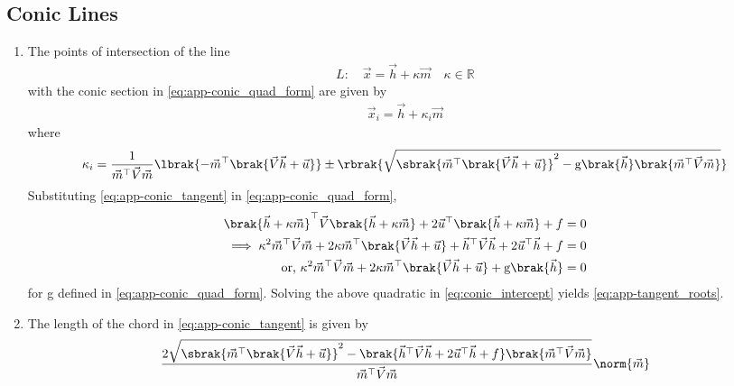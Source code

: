 \subsection{Conic Lines}
\begin{enumerate}[label=\thesubsection.\arabic*.,ref=\thesubsection.\theenumi]
 \item
	 \label{prop:chord}
  The points of intersection of the line 
\begin{align}
L: \quad \vec{x} = \vec{h} + \kappa \vec{m} \quad \kappa \in \mathbb{R}
\label{eq:app-conic_tangent}
\end{align}
with the conic section in \eqref{eq:app-conic_quad_form} are given by
\begin{align}
\vec{x}_i = \vec{h} + \kappa_i \vec{m}
	\label{eq:app-chord-pts}
\end{align}
%
where
\begin{multline}
\kappa_i = \frac{1}
{
\vec{m}^{\top}\vec{V}\vec{m}
}
\lbrak{-\vec{m}^{\top}\brak{\vec{V}\vec{h}+\vec{u}}}
\pm
\rbrak{\sqrt{
\sbrak{
\vec{m}^{\top}\brak{\vec{V}\vec{h}+\vec{u}}
}^2
	-\text{g}
\brak
{\vec{h}
}
\brak{\vec{m}^{\top}\vec{V}\vec{m}}
}
}
\label{eq:app-tangent_roots}
\end{multline}
\solution
  Substituting \eqref{eq:app-conic_tangent}
in \eqref{eq:app-conic_quad_form}, 
\begin{align}
\brak{\vec{h} + \kappa \vec{m}}^{\top}\vec{V}\brak{\vec{h} + \kappa \vec{m}}  + 2 \vec{u}^{\top}\brak{\vec{h} + \kappa \vec{m}}+f &= 0
\\
\implies \kappa^2\vec{m}^{\top}\vec{V}\vec{m} + 2 \kappa\vec{m}^{\top}\brak{\vec{V}\vec{h}+\vec{u}} 
+ \vec{h}^{\top}\vec{V}\vec{h} + 2\vec{u}^{\top}\vec{h} +f &= 0
	\\
	\text{or, }
\kappa^2\vec{m}^{\top}\vec{V}\vec{m} + 2 \kappa\vec{m}^{\top}\brak{\vec{V}\vec{h}+\vec{u}} 
	+ \text{g}\brak{\vec{h}} &=0
\label{eq:conic_intercept}
\end{align}
for g defined in \eqref{eq:app-conic_quad_form}.
Solving the above quadratic in \eqref{eq:conic_intercept}
yields \eqref{eq:app-tangent_roots}.
	\item
		The length of the chord in 
\eqref{eq:app-conic_tangent}
is given by 
\begin{align}
 \frac{2\sqrt{
\sbrak{
\vec{m}^{\top}\brak{\vec{V}\vec{h}+\vec{u}}
}^2
-
\brak
{
\vec{h}^{\top}\vec{V}\vec{h} + 2\vec{u}^{\top}\vec{h} +f
}
\brak{\vec{m}^{\top}\vec{V}\vec{m}}
}
}
{
\vec{m}^{\top}\vec{V}\vec{m}
}\norm{\vec{m}}
\label{eq:chord-len}
  \end{align}
	

\end{enumerate}
